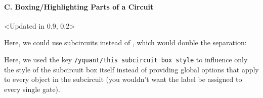 \documentclass{scrartcl}
\makeatletter
\newenvironment{codeexample*}{%
   \VerbatimEnvironment%
   \let\FVB@VerbatimOut\minted@FVB@VerbatimOut
   \let\FVE@VerbatimOut\minted@FVE@VerbatimOut
   \minted@configlang{tex}%
   \minted@fvset
   \begin{VerbatimOut}[codes={\catcode`\^^I=12},firstline,lastline]{\minted@jobname.pyg}%
}{
   \end{VerbatimOut}%
   \minted@langlinenoson%
   \begin{adjustbox}{center}
       \minted@jobname.pyg %
   \end{adjustbox}\nopagebreak
   \expandafter\minted@pygmentize\expandafter{\minted@lang}%
   \minted@langlinenosoff%
   \par%
}
\def\ttlink{\link\texttt}
\def\texlink{\link\tex}
\makeatother
\begin{document}
            \paragraph{C. Boxing/Highlighting Parts of a Circuit}\leavevmode
               \begin{example}<Updated in 0.9, 0.2>
                  \begin{codeexample*}
                  \end{codeexample*}
                  Here, we could use subcircuits instead of \texlink{\enclose}, which would double the separation:

                  \begin{codeexample*}
                  \end{codeexample*}
                  Here, we used the key \ttlink{/yquant/this subcircuit box style} to influence only the style of the subcircuit box itself instead of providing global options that apply to every object in the subcircuit (you wouldn't want the label be assigned to every single gate).
               \end{example}
\end{document}
